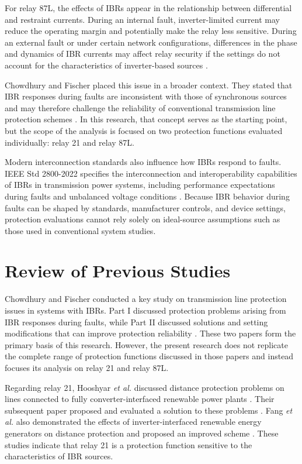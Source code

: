For relay 87L, the effects of IBRs appear in the relationship between differential and restraint currents. During an internal fault, inverter-limited current may reduce the operating margin and potentially make the relay less sensitive. During an external fault or under certain network configurations, differences in the phase and dynamics of IBR currents may affect relay security if the settings do not account for the characteristics of inverter-based sources \cite{li2017analysis,chowdhury2023lcd}.

Chowdhury and Fischer placed this issue in a broader context. They stated that IBR responses during faults are inconsistent with those of synchronous sources and may therefore challenge the reliability of conventional transmission line protection schemes \cite{chowdhury2021tlp1}. In this research, that concept serves as the starting point, but the scope of the analysis is focused on two protection functions evaluated individually: relay 21 and relay 87L.

Modern interconnection standards also influence how IBRs respond to faults. IEEE Std 2800-2022 specifies the interconnection and interoperability capabilities of IBRs in transmission power systems, including performance expectations during faults and unbalanced voltage conditions \cite{ieee2022std2800}. Because IBR behavior during faults can be shaped by standards, manufacturer controls, and device settings, protection evaluations cannot rely solely on ideal-source assumptions such as those used in conventional system studies.

\section{Review of Previous Studies}

Chowdhury and Fischer conducted a key study on transmission line protection issues in systems with IBRs. Part I discussed protection problems arising from IBR responses during faults, while Part II discussed solutions and setting modifications that can improve protection reliability \cite{chowdhury2021tlp1,chowdhury2021tlp2}. These two papers form the primary basis of this research. However, the present research does not replicate the complete range of protection functions discussed in those papers and instead focuses its analysis on relay 21 and relay 87L.

Regarding relay 21, Hooshyar \textit{et al.} discussed distance protection problems on lines connected to fully converter-interfaced renewable power plants \cite{hooshyar2015cirepp1}. Their subsequent paper proposed and evaluated a solution to these problems \cite{hooshyar2015distance_part2}. Fang \textit{et al.} also demonstrated the effects of inverter-interfaced renewable energy generators on distance protection and proposed an improved scheme \cite{fang2019impact}. These studies indicate that relay 21 is a protection function sensitive to the characteristics of IBR sources.


